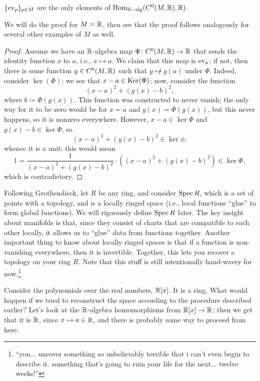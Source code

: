\begin{claim} \label{clm:evaluation_map}
    $\{\operatorname{ev}_p\}_{p \in M}$ are the only elements of $\operatorname{Hom}_{\mathbb R-\mathrm{alg}}(C^0(M, \mathbb R), \mathbb R)$.
\end{claim}
We will do the proof for $M = \mathbb R$, then see that the proof follows analogously for several other examples of $M$ as well.
\begin{proof}
    Assume we have an $\mathbb R$-algebra map $\Phi \colon C^0(M, \mathbb R) \to \mathbb R$ that sends the identity function $x$ to $a$, i.e., $x \mapsto a$. We claim that this map is $\operatorname{ev}_a$; if not, then there is some function $g \in C^0(M, \mathbb R)$ such that $g \not\mapsto g(a)$ under $\Phi$. Indeed, consider $\ker(\Phi)$; we see that $x - a \in \operatorname{Ker}(\Phi)$; now, consider the function
    \[ (x - a)^2 + (g(x) - b)^2, \]
    where $b \coloneq \Phi(g(x))$. This function was constructed to never vanish; the only way for it to be zero would be for $x = a$ and $g(x) = \Phi(g(x))$, but this never happens, so it is nonzero everywhere. However, $x - a \in \ker \Phi$ and $g(x) - b \in \ker \Phi$, so
    \[ (x - a)^2 + (g(x) - b)^2 \in \ker \phi, \]
    whence it is a unit; this would mean
    \[ 1 = \frac{1}{(x - a)^2 + (g(x) - b)^2} \cdot \left((x - a)^2 + (g(x) - b)^2\right) \in \ker \Phi, \]
    which is contradictory.
\end{proof}

\newpage
Following Grothendieck, let $R$ be any ring, and consider $\operatorname{Spec} R$, which is a set of points with a topology, and is a locally ringed space (i.e., local functions ``glue'' to form global functions). We will rigorously define $\operatorname{Spec} R$ later. The key insight about manifolds is that, since they consist of charts that are compatible to each other locally, it allows us to ``glue'' data from functions together. Another important thing to know about locally ringed spaces is that if a function is non-vanishing everywhere, then it is invertible. Together, this lets you recover a topology on your ring $R$. {\color{crimson} Note that this stuff is still intentionally hand-wavey for now.}\footnote{``you... uncover something so unbelievably terrible that i can't even begin to describe it. something that's going to ruin your life for the next... twelve weeks!''}

Consider the polynomials over the real numbers, $\mathbb R[x]$. It is a ring. What would happen if we tried to reconstruct the space according to the procedure described earlier? Let's look at the $\mathbb R$-algebra homomorphisms from $\mathbb R[x] \to \mathbb R$; then we get that it is $\mathbb R$, since $x \mapsto a \in \mathbb R$, and there is probably some way to proceed from here.

